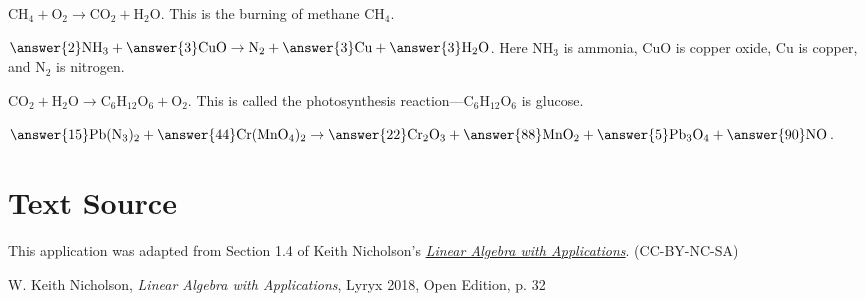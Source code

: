 \documentclass{ximera}
\begin{document}
\begin{problem}\label{chemeqn1}
$\mbox{CH}_{4} + \mbox{O}_2 \to \mbox{CO}_{2} + \mbox{H}_{2}\mbox{O}$. This is the burning of methane $\mbox{CH}_{4}$.
\end{problem}

\begin{problem}\label{chemeqn2}
$\answer{2}\mbox{NH}_{3} + \answer{3}\mbox{CuO} \to \mbox{N}_{2} + \answer{3}\mbox{Cu} + \answer{3}\mbox{H}_{2}\mbox{O}$. Here $\mbox{NH}_{3}$ is ammonia, $\mbox{CuO}$ is copper oxide, $\mbox{Cu}$ is copper, and $\mbox{N}_{2}$ is nitrogen.
\end{problem}

\begin{problem}\label{chemeqn3}
$\mbox{CO}_{2} + \mbox{H}_{2}\mbox{O} \to \mbox{C}_{6}\mbox{H}_{12}\mbox{O}_{6} + \mbox{O}_{2}$. This is called the photosynthesis reaction---$\mbox{C}_{6}\mbox{H}_{12}\mbox{O}_{6}$ is glucose.
\end{problem}

\begin{problem}\label{chemeqn4}
$\answer{15}\mbox{Pb}(\mbox{N}_{3})_{2} + \answer{44}\mbox{Cr}(\mbox{MnO}_{4})_{2} \to \answer{22}\mbox{Cr}_{2}\mbox{O}_{3} + \answer{88}\mbox{MnO}_{2} + \answer{5}\mbox{Pb}_{3}\mbox{O}_{4} + \answer{90}\mbox{NO}$.
\end{problem}

\section*{Text Source} This application was adapted from Section 1.4 of Keith Nicholson's \href{https://open.umn.edu/opentextbooks/textbooks/linear-algebra-with-applications}{\it Linear Algebra with Applications}. (CC-BY-NC-SA)

W. Keith Nicholson, {\it Linear Algebra with Applications}, Lyryx 2018, Open Edition, p. 32 
\end{document}
